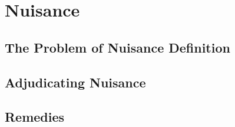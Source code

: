 \chapter{Nuisance}






\section{The Problem of Nuisance Definition} 







\begin{questions}

\end{questions}



\section{Adjudicating Nuisance} 






\begin{questions}

\end{questions}




\section{Remedies}






\begin{questions}

\end{questions}





\begin{questions}

\end{questions}
\endinput
